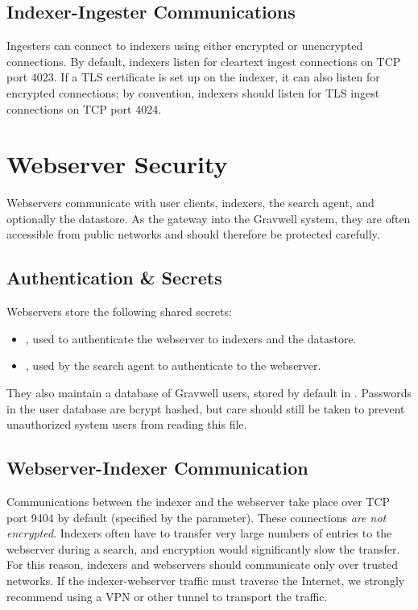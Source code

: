 \subsection{Indexer-Ingester Communications}

Ingesters can connect to indexers using either encrypted or unencrypted
connections. By default, indexers listen for cleartext ingest
connections on TCP port 4023. If a TLS certificate is set up on the
indexer, it can also listen for encrypted connections; by convention,
indexers should listen for TLS ingest connections on TCP port 4024.


\section{Webserver Security}

Webservers communicate with user clients, indexers, the search agent,
and optionally the datastore. As the gateway into the Gravwell system,
they are often accessible from public networks and should therefore be
protected carefully.

\subsection{Authentication \& Secrets}

Webservers store the following shared secrets:

\begin{itemize}
\tightlist
\item
  , used to authenticate the webserver to indexers and
  the datastore.
\item
  , used by the search agent to authenticate to the
  webserver.
\end{itemize}

They also maintain a database of Gravwell users, stored by default in
. Passwords in the user database are
bcrypt hashed, but care should still be taken to prevent unauthorized
system users from reading this file.

\subsection{Webserver-Indexer Communication}

Communications between the indexer and the webserver take place over
TCP port 9404 by default (specified by the  parameter).
These connections \emph{are not encrypted}. Indexers often have to transfer
very large numbers of entries to the webserver during a search, and
encryption would significantly slow the transfer. For this reason,
indexers and webservers should communicate only over trusted networks.
If the indexer-webserver traffic must traverse the Internet, we
strongly recommend using a VPN or other tunnel to transport the
traffic.


